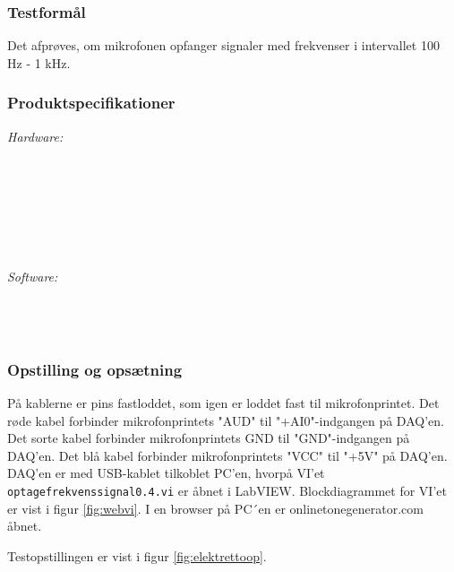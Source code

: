 		\subsubsection{Testformål}
		Det afprøves, om mikrofonen opfanger signaler med frekvenser i intervallet 100 Hz - 1 kHz.
		
		\subsubsection{Produktspecifikationer}
	
			\textit{Hardware:}\\
			\elektretto\\
			\pinstre\\
			\mikrofonkabel\\
			\krympeflex\\
			\daq\\
			\daqusb\\			
			\PC\\
	
			\textit{Software:}\\
			\labview\\
			\daqsoft\\
			\onlineg\\

	
		\subsubsection{Opstilling og opsætning}
		På kablerne er pins fastloddet, som igen er loddet fast til mikrofonprintet. Det røde kabel forbinder mikrofonprintets "AUD" til "+AI0"-indgangen på DAQ'en. Det sorte kabel forbinder mikrofonprintets GND til "GND"-indgangen på DAQ'en. Det blå kabel forbinder mikrofonprintets "VCC" til "+5V" på DAQ'en. DAQ'en er med USB-kablet tilkoblet PC'en, hvorpå VI'et \texttt{optagefrekvenssignal0.4.vi} er åbnet i LabVIEW. Blockdiagrammet for VI'et er vist i figur \ref{fig:webvi}. I en browser på PC´en er onlinetonegenerator.com åbnet.       
		
		Testopstillingen er vist i figur \ref{fig:elektrettoop}.\\
		
